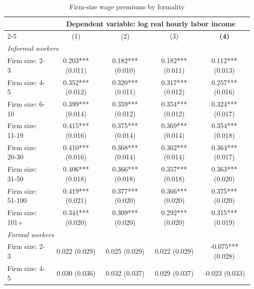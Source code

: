 \begin{table}[htbp]
  \centering
  \caption{Firm-size wage premiums by formality}
  \label{tab:firm-size-local-geography-formality-robustness}
  \scriptsize
  \begin{tabular}{lcccc}
    \toprule
    & \multicolumn{4}{c}{Dependent variable: log real hourly labor income} \\
    \cmidrule(lr){2-5}
    & (1) & (2) & (3) & \textbf{(4)} \\
    \midrule
    \multicolumn{5}{l}{\textit{Informal workers}} \\
    Firm size: 2-3 & 0.203*** {\scriptsize (0.011)} & 0.182*** {\scriptsize (0.010)} & 0.182*** {\scriptsize (0.011)} & 0.112*** {\scriptsize (0.013)} \\
    Firm size: 4-5 & 0.352*** {\scriptsize (0.012)} & 0.320*** {\scriptsize (0.011)} & 0.317*** {\scriptsize (0.012)} & 0.257*** {\scriptsize (0.016)} \\
    Firm size: 6-10 & 0.399*** {\scriptsize (0.014)} & 0.359*** {\scriptsize (0.012)} & 0.354*** {\scriptsize (0.012)} & 0.324*** {\scriptsize (0.017)} \\
    Firm size: 11-19 & 0.415*** {\scriptsize (0.016)} & 0.375*** {\scriptsize (0.014)} & 0.369*** {\scriptsize (0.014)} & 0.354*** {\scriptsize (0.018)} \\
    Firm size: 20-30 & 0.410*** {\scriptsize (0.016)} & 0.368*** {\scriptsize (0.014)} & 0.362*** {\scriptsize (0.014)} & 0.364*** {\scriptsize (0.017)} \\
    Firm size: 31-50 & 0.406*** {\scriptsize (0.018)} & 0.366*** {\scriptsize (0.018)} & 0.357*** {\scriptsize (0.018)} & 0.363*** {\scriptsize (0.020)} \\
    Firm size: 51-100 & 0.419*** {\scriptsize (0.021)} & 0.377*** {\scriptsize (0.020)} & 0.366*** {\scriptsize (0.020)} & 0.375*** {\scriptsize (0.020)} \\
    Firm size: 101+ & 0.341*** {\scriptsize (0.020)} & 0.309*** {\scriptsize (0.020)} & 0.292*** {\scriptsize (0.020)} & 0.315*** {\scriptsize (0.019)} \\
    \midrule
    \multicolumn{5}{l}{\textit{Formal workers}} \\
    Firm size: 2-3 & 0.022 {\scriptsize (0.029)} & 0.025 {\scriptsize (0.029)} & 0.022 {\scriptsize (0.029)} & -0.075*** {\scriptsize (0.028)} \\
    Firm size: 4-5 & 0.030 {\scriptsize (0.036)} & 0.032 {\scriptsize (0.037)} & 0.029 {\scriptsize (0.037)} & -0.023 {\scriptsize (0.033)} \\

\end{tabular}
\end{table}
